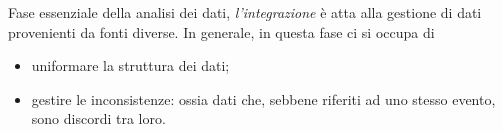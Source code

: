 \documentclass{subfiles}
\begin{document}
Fase essenziale della analisi dei dati, \emph{l'integrazione} è atta alla gestione di dati provenienti da fonti diverse.
In generale, in questa fase ci si occupa di
\begin{itemize}
    \item uniformare la struttura dei dati;
    \item gestire le inconsistenze: ossia dati che, sebbene riferiti ad uno stesso evento, sono discordi tra loro.
\end{itemize}
\end{document}
